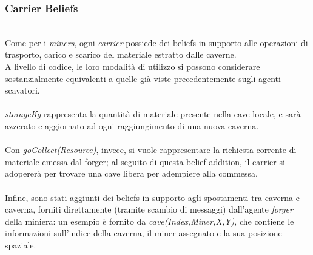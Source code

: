 \documentclass{llncs}
\begin{document}
\subsubsection{Carrier Beliefs}~
\\
Come per i \textit{miners}, ogni \textit{carrier} possiede dei beliefs in supporto alle operazioni di trasporto, carico e scarico del materiale estratto dalle caverne.\\A livello di codice, le loro modalità di utilizzo si possono considerare sostanzialmente equivalenti a quelle già viste precedentemente sugli agenti scavatori.\\\\
\textit{storageKg} rappresenta la quantità di materiale presente nella cave locale, e sarà azzerato e aggiornato ad ogni raggiungimento di una nuova caverna.\\\\
Con \textit{goCollect(Resource)}, invece, si vuole rappresentare la richiesta corrente di materiale emessa dal forger; al seguito di questa belief addition, il carrier si adopererà per trovare una cave libera per adempiere alla commessa.\\\\
Infine, sono stati aggiunti dei beliefs in supporto agli spostamenti tra caverna e caverna, forniti direttamente (tramite scambio di messaggi) dall'agente \textit{forger} della miniera: un esempio è fornito da \textit{cave(Index,Miner,X,Y)}, che contiene le informazioni sull'indice della caverna, il miner assegnato e la sua posizione spaziale.\newpage
\end{document}
